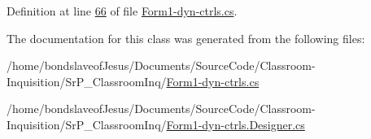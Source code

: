 \-Definition at line \hyperlink{_form1-dyn-ctrls_8cs_source_l00066}{66} of file \hyperlink{_form1-dyn-ctrls_8cs_source}{\-Form1-\/dyn-\/ctrls.\-cs}.



\-The documentation for this class was generated from the following files\-:\begin{DoxyCompactItemize}
\item 
/home/bondslaveof\-Jesus/\-Documents/\-Source\-Code/\-Classroom-\/\-Inquisition/\-Sr\-P\-\_\-\-Classroom\-Inq/\hyperlink{_form1-dyn-ctrls_8cs}{\-Form1-\/dyn-\/ctrls.\-cs}\item 
/home/bondslaveof\-Jesus/\-Documents/\-Source\-Code/\-Classroom-\/\-Inquisition/\-Sr\-P\-\_\-\-Classroom\-Inq/\hyperlink{_form1-dyn-ctrls_8_designer_8cs}{\-Form1-\/dyn-\/ctrls.\-Designer.\-cs}\end{DoxyCompactItemize}
